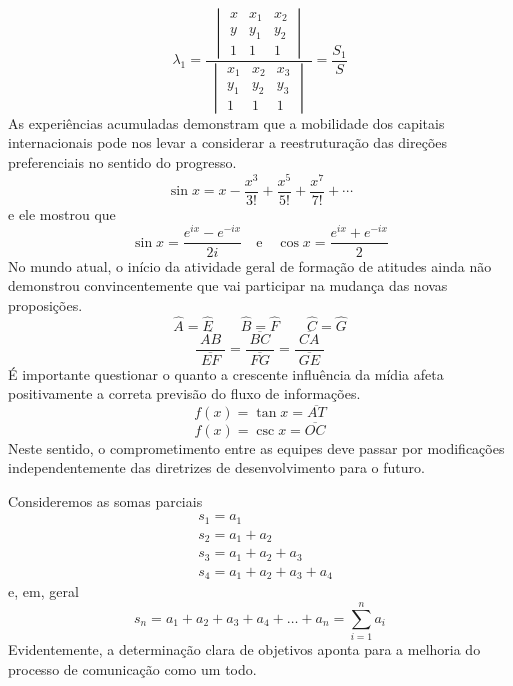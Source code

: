 \begin{apendicesenv}
    \[
        \lambda_1 = \frac
        {
            \begin{vmatrix}
                x & x_1 & x_2 \\
                y & y_1 & y_2 \\
                1 & 1   & 1
            \end{vmatrix}
        }
        {\;
            \begin{vmatrix}
                x_1 & x_2 & x_3 \\
                y_1 & y_2 & y_3 \\
                1   & 1   & 1
            \end{vmatrix}
            \;
        }
        = \frac{S_1}{S}
    \]
    As experiências acumuladas
    demonstram que a mobilidade dos capitais internacionais pode nos levar a
    considerar a reestruturação das direções preferenciais no sentido do progresso.
    \[
        \sin x = x - \frac{x^{3}}{3!} + \frac{x^{5}}{5!} + \frac{x^{7}}{7!} + \cdots
    \]
    e ele mostrou que
    \[
        \sin x = \frac{e^{ix}-e^{-ix}}{2i} \quad \text{e} \quad \cos x = \frac {e^{ix} + e^{-ix}}{2}
    \]
    No mundo atual, o início da atividade geral de formação de atitudes ainda não
    demonstrou convincentemente que vai participar na mudança das novas proposições.
    \[
        \hat{A} = \hat{E} \qquad  \hat{B} = \hat{F} \qquad \hat{C} = \hat{G}
    \]
    \[
        \frac{\;\overline{AB}\;}{\;\overline{EF}\;}
        = \frac{\;\overline{BC}\;}{\;\overline{FG}\;}
        = \frac{\;\overline{CA}\;}{\;\overline{GE}\;}
    \]
    É importante questionar o quanto a crescente influência da mídia afeta
    positivamente a correta previsão do fluxo de informações.
    \[
        f(x) = \tan x = \overline{AT}
    \]
    \[
        f(x) = \csc x = \overline{OC}
    \]
    Neste sentido, o
    comprometimento entre as equipes deve passar por modificações independentemente
    das diretrizes de desenvolvimento para o futuro.


    Consideremos as somas parciais
    \begin{align*}
         & s_1 = a_1                   \\
         & s_2 = a_1 + a_2             \\
         & s_3 = a_1 + a_2 + a_3       \\
         & s_4 = a_1 + a_2 + a_3 + a_4
    \end{align*}
    e, em, geral
    \[
        s_n = a_1 + a_2 + a_3 + a_4 + \dots + a_n
        = \sum_{i=1}^{n} a_i
    \]
    Evidentemente, a determinação
    clara de objetivos aponta para a melhoria do processo de comunicação como um
    todo.

\end{apendicesenv}
